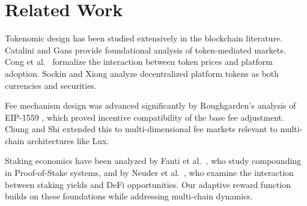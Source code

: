 \section{Related Work}
\label{sec:related}

Tokenomic design has been studied extensively in the blockchain literature. Catalini and Gans \cite{catalini2016} provide foundational analysis of token-mediated markets. Cong et al.\ \cite{cong2021tokenomics} formalize the interaction between token prices and platform adoption. Sockin and Xiong \cite{sockin2023} analyze decentralized platform tokens as both currencies and securities.

Fee mechanism design was advanced significantly by Roughgarden's analysis of EIP-1559 \cite{roughgarden2020eip1559}, which proved incentive compatibility of the base fee adjustment. Chung and Shi \cite{chung2023} extended this to multi-dimensional fee markets relevant to multi-chain architectures like Lux.

Staking economics have been analyzed by Fanti et al.\ \cite{fanti2019economics}, who study compounding in Proof-of-Stake systems, and by Neuder et al.\ \cite{neuder2021}, who examine the interaction between staking yields and DeFi opportunities. Our adaptive reward function builds on these foundations while addressing multi-chain dynamics.

